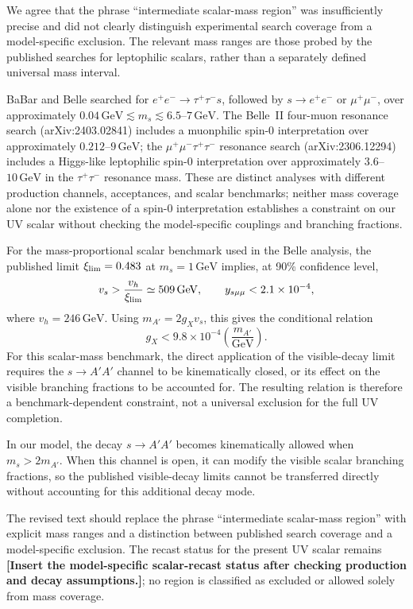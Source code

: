 \documentclass[12pt,a4paper]{article}
\begin{document}
We agree that the phrase ``intermediate scalar-mass region'' was insufficiently precise and did not clearly distinguish experimental search coverage from a model-specific exclusion. The relevant mass ranges are those probed by the published searches for leptophilic scalars, rather than a separately defined universal mass interval.

BaBar and Belle searched for
\(e^+e^-\to\tau^+\tau^-s\), followed by
\(s\to e^+e^-\) or \(\mu^+\mu^-\), over approximately
\(0.04\,\mathrm{GeV}\lesssim m_s\lesssim6.5\)--\(7\,\mathrm{GeV}\).
The Belle~II four-muon resonance search (arXiv:2403.02841) includes a muonphilic spin-0 interpretation over approximately \(0.212\)--\(9\,\mathrm{GeV}\); the \(\mu^+\mu^-\tau^+\tau^-\) resonance search (arXiv:2306.12294) includes a Higgs-like leptophilic spin-0 interpretation over approximately \(3.6\)--\(10\,\mathrm{GeV}\) in the \(\tau^+\tau^-\) resonance mass. These are distinct analyses with different production channels, acceptances, and scalar benchmarks; neither mass coverage alone nor the existence of a spin-0 interpretation establishes a constraint on our UV scalar without checking the model-specific couplings and branching fractions.

For the mass-proportional scalar benchmark used in the Belle analysis, the published limit \(\xi_{\rm lim}=0.483\) at \(m_s=1\,\mathrm{GeV}\) implies, at 90\% confidence level,
\[
v_s>\frac{v_h}{\xi_{\rm lim}}
\simeq509\,\mathrm{GeV},
\qquad
y_{s\mu\mu}<2.1\times10^{-4},
\]
where \(v_h=246\,\mathrm{GeV}\). Using \(m_{A'}=2g_Xv_s\), this gives the conditional relation
\[
g_X<9.8\times10^{-4}
\left(\frac{m_{A'}}{\mathrm{GeV}}\right).
\]
For this scalar-mass benchmark, the direct application of the visible-decay limit requires the \(s\to A'A'\) channel to be kinematically closed, or its effect on the visible branching fractions to be accounted for. The resulting relation is therefore a benchmark-dependent constraint, not a universal exclusion for the full UV completion.

In our model, the decay \(s\to A'A'\) becomes kinematically allowed when \(m_s>2m_{A'}\). When this channel is open, it can modify the visible scalar branching fractions, so the published visible-decay limits cannot be transferred directly without accounting for this additional decay mode.

The revised text should replace the phrase ``intermediate scalar-mass region'' with explicit mass ranges and a distinction between published search coverage and a model-specific exclusion. The recast status for the present UV scalar remains \textbf{[Insert the model-specific scalar-recast status after checking production and decay assumptions.]}; no region is classified as excluded or allowed solely from mass coverage.
\end{document}
